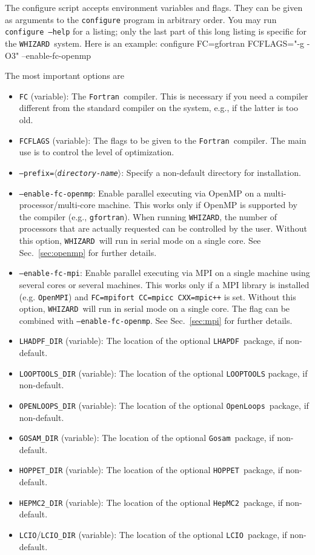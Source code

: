 \documentclass[12pt]{book}
\newenvironment{interaction}%
  {\begingroup\small
   \Verbatim}%
  {\endVerbatim
   \endgroup\noindent}
\newcommand{\var}[1]{$\langle$\textit{#1}$\rangle$}
\newcommand{\ttt}[1]{\texttt{#1}}
\newcommand{\whizard}{\ttt{WHIZARD}}
\newcommand{\lcio}{\ttt{LCIO}}
\newcommand{\lhapdf}{\ttt{LHAPDF}}
\newcommand{\hepmctwo}{\ttt{HepMC2}}
\newcommand{\hoppet}{\ttt{HOPPET}}
\newcommand{\gosam}{\ttt{Gosam}}
\newcommand{\openloops}{\ttt{OpenLoops}}
\newcommand{\fortran}{\ttt{Fortran}}
\begin{document}
The configure script accepts environment variables and flags.  They
can be given as arguments to the \ttt{configure} program in arbitrary
order.  You may run \ttt{configure --help} for a listing; only the
last part of this long listing is specific for the \whizard\ system.
Here is an example:
\begin{interaction}
  configure  FC=gfortran  FCFLAGS="-g -O3"  --enable-fc-openmp
\end{interaction}

The most important options are
\begin{itemize}
\item
  \ttt{FC} (variable): The \fortran\ compiler.  This is necessary if
  you need a compiler different from the standard compiler on the
  system, e.g., if the latter is too old.
\item
  \ttt{FCFLAGS} (variable): The flags to be given to the \fortran\
  compiler.  The main use is to control the level of optimization.
\item
  \ttt{--prefix=\var{directory-name}}: Specify a non-default directory
  for installation.
\item
  \ttt{--enable-fc-openmp}: Enable parallel executing via OpenMP on a
  multi-processor/multi-core machine.  This works only if OpenMP is
  supported by the compiler (e.g., \ttt{gfortran}).  When running
  \whizard, the number of processors that are actually requested can
  be controlled by the user.  Without this option, \whizard\ will run
  in serial mode on a single core.  See Sec.~\ref{sec:openmp} for
  further details.
\item
  \ttt{--enable-fc-mpi}: Enable parallel executing via MPI on a single
  machine using several cores or several machines. This works only if a MPI
  library is installed (e.g. \ttt{OpenMPI}) and \ttt{FC=mpifort CC=mpicc CXX=mpic++} is
  set. Without this option, \whizard\ will run in serial mode on a single core.
  The flag can be combined with \ttt{--enable-fc-openmp}. See Sec.~\ref{sec:mpi}
  for further details.
\item
  \ttt{LHADPF\_DIR} (variable): The location of the optional \lhapdf\
  package, if non-default.
\item
  \ttt{LOOPTOOLS\_DIR} (variable): The location of the optional \ttt{LOOPTOOLS}
  package, if non-default.
\item
  \ttt{OPENLOOPS\_DIR} (variable): The location of the optional \openloops\
  package, if non-default.
\item
  \ttt{GOSAM\_DIR} (variable): The location of the optional \gosam\
  package, if non-default.
\item
  \ttt{HOPPET\_DIR} (variable): The location of the optional \hoppet\
  package, if non-default.
\item
  \ttt{HEPMC2\_DIR} (variable): The location of the optional \hepmctwo\ package, if
  non-default.
\item
  \ttt{LCIO}/\ttt{LCIO\_DIR} (variable): The location of the optional
  \lcio\ package, if non-default.
\end{itemize}
\end{document}
